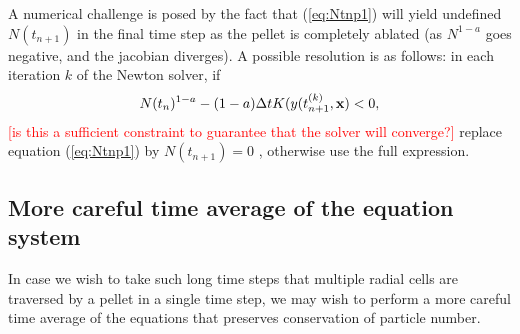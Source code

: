 \documentclass[11pt,a4paper]{article}
\renewcommand{\b}[1]{\ensuremath{ {\bf #1 } }}
\begin{document}
A numerical challenge is posed by the fact that (\ref{eq:Ntnp1}) will yield undefined $N(t_{n+1})$ in the final time step as the pellet is completely ablated (as $N^{1-a}$ goes negative, and the jacobian diverges). A possible resolution is as follows: in each iteration $k$ of the Newton solver, if
\begin{align}
N(t_n)^{1-a} - (1-a)\Delta t K(y(t_{n+1}^{(k)},\b{x}) < 0,
\end{align}
\textcolor{red}{[is this a sufficient constraint to guarantee that the solver will converge?]} replace equation (\ref{eq:Ntnp1}) by $N(t_{n+1}) = 0$ , otherwise use the full expression.

\subsection*{More careful time average of the equation system}
In case we wish to take such long time steps that multiple radial cells are traversed by a pellet in a single time step, we may wish to perform a more careful time average of the equations that preserves conservation of particle number.
\end{document}
